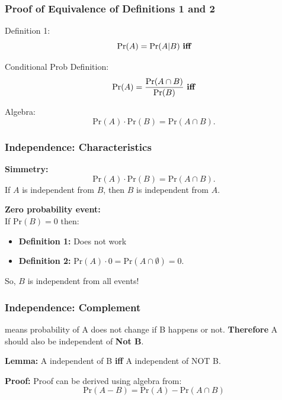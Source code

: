 \documentclass{beamer}
\begin{document}
\begin{frame}
  \frametitle{Proof of Equivalence of Definitions 1 and 2}

  Definition 1:
  \begin{equation*}
    \text{Pr}(A) = \text{Pr}(A|B) \text{ {\bf iff}}
  \end{equation*}

  \bigskip

  Conditional Prob Definition:
  \begin{equation*}
    \text{Pr}(A) = \frac{\text{Pr}(A \cap B)}{\text{Pr}(B)} \text{ {\bf iff}}
  \end{equation*}

  \bigskip

  Algebra:
  \begin{equation*}
    \text{Pr}(A)\cdot\text{Pr}(B) = \text{Pr}(A \cap B).
  \end{equation*}
\end{frame}

\begin{frame}
  \frametitle{Independence: Characteristics}

  {\bf Simmetry:}
  \begin{equation*}
    \text{Pr}(A)\cdot\text{Pr}(B) = \text{Pr}(A \cap B).
  \end{equation*}
  If $A$ is independent from $B$, \alert{then} $B$ is independent from $A$.

  \vfill

  {\bf Zero probability event:}\\
  If Pr$(B) = 0$ then:
  \begin{itemize}
  \item {\bf Definition 1:} Does not work
  \item {\bf Definition 2:} $\text{Pr}(A)\cdot0 = \text{Pr}(A \cap
    \emptyset) = 0$.
  \end{itemize}
  So, $B$ is \alert{independent from all events}!
\end{frame}

\begin{frame}
  \frametitle{Independence: Complement}

   means probability of A does not
  change \alert{if B happens or not}. {\bf Therefore} A should also be
  independent of {\bf Not B}.

  \vfill
  {\bf Lemma:} A independent of B {\bf iff} A independent of NOT B.

  \vfill
  
  {\bf Proof:} Proof can be derived using algebra from:
  \begin{equation*}
    \text{Pr}(A-B) = \text{Pr}(A)-\text{Pr}(A\cap B)
  \end{equation*}
\end{frame}
\end{document}
